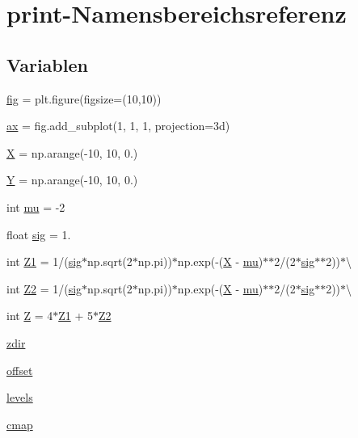 \hypertarget{namespaceprint}{}\section{print-\/\+Namensbereichsreferenz}
\label{namespaceprint}
\subsection*{Variablen}
\begin{DoxyCompactItemize}
\item 
\mbox{\hyperlink{namespaceprint_a8080002122fd53cadd2b548837d037aa}{fig}} = plt.\+figure(figsize=(10,10))
\item 
\mbox{\hyperlink{namespaceprint_a980229015cfaa5dda779f5e1df7e4013}{ax}} = fig.\+add\+\_\+subplot(1, 1, 1, projection=\textquotesingle{}3d\textquotesingle{})
\item 
\mbox{\hyperlink{namespaceprint_affd04964e07d6931f5b7f92164b9b99f}{X}} = np.\+arange(-\/10, 10, 0.)
\item 
\mbox{\hyperlink{namespaceprint_aab512732eb82cbe258baa68f9f9add63}{Y}} = np.\+arange(-\/10, 10, 0.)
\item 
int \mbox{\hyperlink{namespaceprint_a0d1f4b3564b3a18949e4a9d42c0fe83b}{mu}} = -\/2
\item 
float \mbox{\hyperlink{namespaceprint_a1efc77cd3bf0d758b07ec8e2b2c71c6b}{sig}} = 1.
\item 
int \mbox{\hyperlink{namespaceprint_acc02b068ba7893cb51896817458953b1}{Z1}} = 1/(\mbox{\hyperlink{namespaceprint_a1efc77cd3bf0d758b07ec8e2b2c71c6b}{sig}}$\ast$np.\+sqrt(2$\ast$np.\+pi))$\ast$np.\+exp(-\/(\mbox{\hyperlink{namespaceprint_affd04964e07d6931f5b7f92164b9b99f}{X}} -\/ \mbox{\hyperlink{namespaceprint_a0d1f4b3564b3a18949e4a9d42c0fe83b}{mu}})$\ast$$\ast$2/(2$\ast$\mbox{\hyperlink{namespaceprint_a1efc77cd3bf0d758b07ec8e2b2c71c6b}{sig}}$\ast$$\ast$2))$\ast$\textbackslash{}
\item 
int \mbox{\hyperlink{namespaceprint_a09064592a1be5db47dee477a81ae8bf3}{Z2}} = 1/(\mbox{\hyperlink{namespaceprint_a1efc77cd3bf0d758b07ec8e2b2c71c6b}{sig}}$\ast$np.\+sqrt(2$\ast$np.\+pi))$\ast$np.\+exp(-\/(\mbox{\hyperlink{namespaceprint_affd04964e07d6931f5b7f92164b9b99f}{X}} -\/ \mbox{\hyperlink{namespaceprint_a0d1f4b3564b3a18949e4a9d42c0fe83b}{mu}})$\ast$$\ast$2/(2$\ast$\mbox{\hyperlink{namespaceprint_a1efc77cd3bf0d758b07ec8e2b2c71c6b}{sig}}$\ast$$\ast$2))$\ast$\textbackslash{}
\item 
int \mbox{\hyperlink{namespaceprint_a9433aedd977f6182d23edaf955e46742}{Z}} = 4$\ast$\mbox{\hyperlink{namespaceprint_acc02b068ba7893cb51896817458953b1}{Z1}} + 5$\ast$\mbox{\hyperlink{namespaceprint_a09064592a1be5db47dee477a81ae8bf3}{Z2}}
\item 
\mbox{\hyperlink{namespaceprint_a25485f663d582df21114be2f03bad0e0}{zdir}}
\item 
\mbox{\hyperlink{namespaceprint_a63b63e4e6ea6a9b03c0e161424d919e8}{offset}}
\item 
\mbox{\hyperlink{namespaceprint_a811f3257310281e4a58230ebd65dcc71}{levels}}
\item 
\mbox{\hyperlink{namespaceprint_a4c39ba09ea1a62ecd2fc116b9ef27c42}{cmap}}
\end{DoxyCompactItemize}


